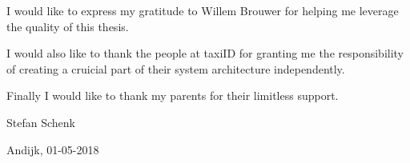 
\begin{acknowledgements}

	I would like to express my gratitude to Willem Brouwer for helping me leverage the quality of this thesis.

	I would also like to thank the people at taxiID for granting me the responsibility of creating a cruicial part of their system architecture independently.

	Finally I would like to thank my parents for their limitless support.

  Stefan Schenk

  Andijk, 01-05-2018

\end{acknowledgements}

